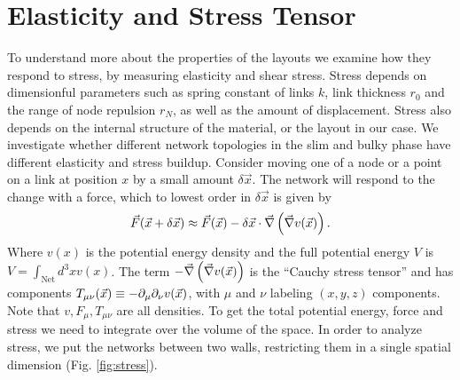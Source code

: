 \documentclass[nofootinbib,preprint,endfloats]{revtex4} %
\begin{document}
\section{Elasticity and Stress Tensor}
To understand more about the properties of the layouts we examine how they respond to stress, by measuring elasticity and shear stress. 
Stress depends on dimensionful parameters such as spring constant of links $k$, link thickness $r_0$ and the range of node repulsion $r_N$, as well as the amount of displacement. 
Stress also depends on the internal structure of the material, or the layout in our case. 
We investigate whether different network topologies in the slim and bulky phase have different elasticity and stress buildup. 
Consider moving one of a node or a point on a link at position $x$ by a small amount $\delta \vec{x}$.
The network will respond to the change with a force, which to lowest order in $\delta \vec{x}$ is given by
\[\vec{F} (\vec{x}+\delta \vec{x}) \approx %
\vec{F} (\vec{x})-\delta \vec{x}\cdot  \vec{\del} \pr{\vec{\del} v (\vec{x})}.\]
Where $v(x)$ is the potential energy density and the full potential energy $V$ is $V = \int_\mathrm{Net} d^3x v(x)$. 
The term $-\vec{\nabla} \left(\vec{\nabla} v (\vec{x})\right)$ is the ``Cauchy stress tensor'' and has components $T_{\mu\nu}(\vec{x}) \equiv -\partial_\mu\partial_\nu v(\vec{x})$, with $\mu$ and $\nu$ labeling $(x,y,z)$ components. 
Note that $v,F_\mu,T_{\mu\nu}$ are all densities. 
To get the total potential energy, force and stress we need to integrate over the volume of the space. 
In order to analyze stress, we put the networks between two walls, restricting them in a single spatial dimension (Fig. \ref{fig:stress}).
\end{document}
